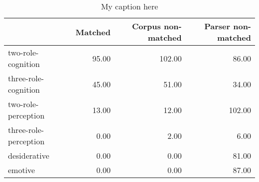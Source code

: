 \begin{table}[!ht]
\centering
\begin{tabular}{lrrr}
\toprule
{} &  Matched &  Corpus non-matched &  Parser non-matched \\
\midrule
two-role-cognition    &    95.00 &              102.00 &               86.00 \\
three-role-cognition  &    45.00 &               51.00 &               34.00 \\
two-role-perception   &    13.00 &               12.00 &              102.00 \\
three-role-perception &     0.00 &                2.00 &                6.00 \\
desiderative          &     0.00 &                0.00 &               81.00 \\
emotive               &     0.00 &                0.00 &               87.00 \\
\bottomrule
\end{tabular}
\caption{My caption here}
\label{tab:MENTAL-oe-data}
\end{table}